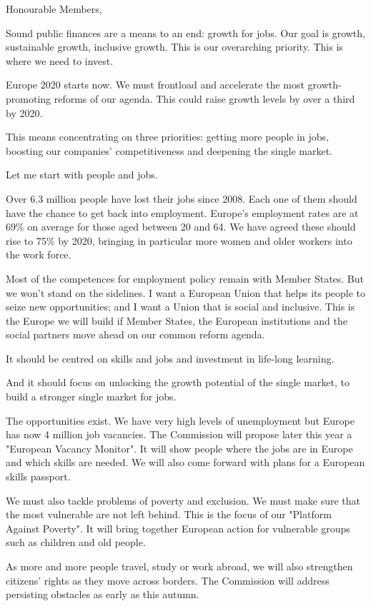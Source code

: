 \documentclass[a4paper,11pt]{article}
\begin{document}
Honourable Members,

Sound public finances are a means to an end: growth for jobs. Our goal is growth, sustainable growth, inclusive growth. This is our overarching priority. This is where we need to invest.

Europe 2020 starts now. We must frontload and accelerate the most growth-promoting reforms of our agenda. This could raise growth levels by over a third by 2020.

This means concentrating on three priorities: getting more people in jobs, boosting our companies' competitiveness and deepening the single market.

Let me start with people and jobs.

Over 6.3 million people have lost their jobs since 2008. Each one of them should have the chance to get back into employment. Europe's employment rates are at 69\% on average for those aged between 20 and 64. We have agreed these should rise to 75\% by 2020, bringing in particular more women and older workers into the work force.

Most of the competences for employment policy remain with Member States. But we won't stand on the sidelines. I want a European Union that helps its people to seize new opportunities; and I want a Union that is social and inclusive. This is the Europe we will build if Member States, the European institutions and the social partners move ahead on our common reform agenda.

It should be centred on skills and jobs and investment in life-long learning.

And it should focus on unlocking the growth potential of the single market, to build a stronger single market for jobs.

The opportunities exist. We have very high levels of unemployment but Europe has now 4 million job vacancies. The Commission will propose later this year a "European Vacancy Monitor". It will show people where the jobs are in Europe and which skills are needed. We will also come forward with plans for a European skills passport.

We must also tackle problems of poverty and exclusion. We must make sure that the most vulnerable are not left behind. This is the focus of our "Platform Against Poverty". It will bring together European action for vulnerable groups such as children and old people.

As more and more people travel, study or work abroad, we will also strengthen citizens' rights as they move across borders. The Commission will address persisting obstacles as early as this autumn.
\end{document}

